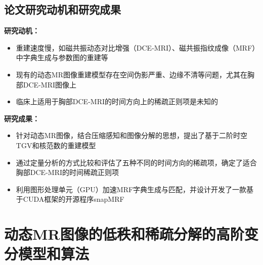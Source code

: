 \documentclass{beamer}
\begin{document}

\subsection{论文研究动机和研究成果}
\begin{frame}
\textbf{研究动机：}
	\begin{itemize}
		\item 重建速度慢，如磁共振动态对比增强（DCE-MRI）、磁共振指纹成像（MRF）中字典生成与参数图的重建等
		\item 现有的动态MR图像重建模型存在空间伪影严重、边缘不清等问题，尤其在胸部DCE-MRI图像上
		\item 临床上适用于胸部DCE-MRI的时间方向上的稀疏正则项是未知的
	\end{itemize}
	\textbf{研究成果：}
	\begin{itemize}
		\item 针对动态MR图像，结合压缩感知和图像分解的思想，提出了基于二阶时空TGV和核范数的重建模型
		\item 通过定量分析的方式比较和评估了五种不同的时间方向的稀疏项，确定了适合胸部DCE-MRI的时间稀疏正则项
		\item 利用图形处理单元（GPU）加速MRF字典生成与匹配，并设计开发了一款基于CUDA框架的开源程序snapMRF
	\end{itemize}
\end{frame}

\section{动态MR图像的低秩和稀疏分解的高阶变分模型和算法}
    \begin{frame}
    \end{frame}
\end{document}
